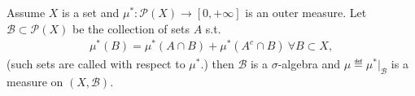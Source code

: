 \fi
\begin{theorem}
    Assume \(X\) is a set and \(\mu^*: \mathcal{P}(X)\rightarrow [0,+\infty]\) is an outer measure. Let \(\mathcal{B}\subset\mathcal{P}(X)\) be the collection of sets \(A\) s.t.
    \begin{align*}
        \mu^*(B) = \mu^*(A\cap B) + \mu^*(A^c\cap B) \ \forall B\subset X,
    \end{align*}
    (such sets are called with respect to \(\mu^*\).) then \(\mathcal{B}\) is a \(\sigma\)-algebra and \(\mu\eqdef \mu^*\vert_{\mathcal{B}}\) is a measure on \((X,\mathcal{B})\).
\end{theorem}